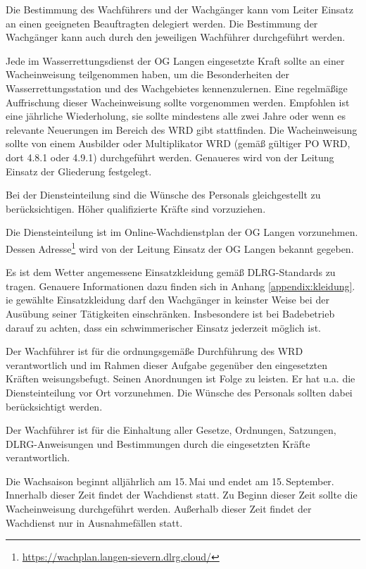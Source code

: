 Die Bestimmung des Wachführers und der Wachgänger kann vom Leiter Einsatz an einen geeigneten Beauftragten delegiert werden. Die Bestimmung der Wachgänger kann auch durch den jeweiligen Wachführer durchgeführt werden.

Jede im Wasserrettungsdienst der OG Langen eingesetzte Kraft sollte an einer Wacheinweisung teilgenommen haben, um die Besonderheiten der Wasserrettungsstation und des Wachgebietes kennenzulernen. 
Eine regelmäßige Auffrischung dieser Wacheinweisung sollte vorgenommen werden. 
Empfohlen ist eine jährliche Wiederholung, sie sollte mindestens alle zwei Jahre oder wenn es relevante Neuerungen im Bereich des WRD gibt stattfinden. 
Die Wacheinweisung sollte von einem Ausbilder oder Multiplikator WRD (gemäß gültiger PO WRD, dort 4.8.1 oder 4.9.1) durchgeführt werden. 
Genaueres wird von der Leitung Einsatz der Gliederung festgelegt.

Bei der Diensteinteilung sind die Wünsche des Personals gleichgestellt zu berücksichtigen. Höher qualifizierte Kräfte sind vorzuziehen.

Die Diensteinteilung ist im Online-Wachdienstplan der OG Langen vorzunehmen. Dessen Adresse\footnote{\url{https://wachplan.langen-sievern.dlrg.cloud/}} wird von der Leitung Einsatz der OG Langen bekannt gegeben.

Es ist dem Wetter angemessene Einsatzkleidung gemäß DLRG-Standards zu tragen. Genauere Informationen dazu finden sich in Anhang \vref{appendix:kleidung}.
ie gewählte Einsatzkleidung darf den Wachgänger in keinster Weise bei der Ausübung seiner Tätigkeiten einschränken. Insbesondere ist bei Badebetrieb darauf zu achten, dass ein schwimmerischer Einsatz jederzeit möglich ist.

Der Wachführer ist für die ordnungsgemäße Durchführung des WRD verantwortlich und im Rahmen dieser Aufgabe gegenüber den eingesetzten Kräften weisungsbefugt. Seinen Anordnungen ist Folge zu leisten. Er hat u.a. die Diensteinteilung vor Ort vorzunehmen. Die Wünsche des Personals sollten dabei berücksichtigt werden.

Der Wachführer ist für die Einhaltung aller Gesetze, Ordnungen, Satzungen, DLRG-Anweisungen und Bestimmungen durch die eingesetzten Kräfte verantwortlich.
 
Die Wachsaison beginnt alljährlich am 15.\,Mai und endet am 15.\,September. Innerhalb dieser Zeit findet der Wachdienst statt. Zu Beginn dieser Zeit sollte die Wacheinweisung durchgeführt werden. Außerhalb dieser Zeit findet der Wachdienst nur in Ausnahmefällen statt.


